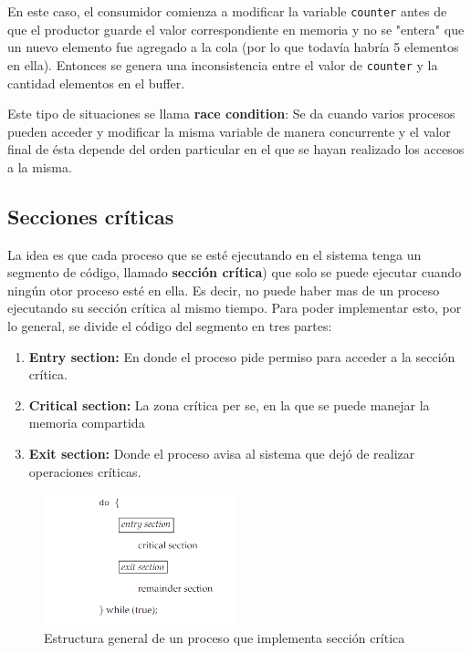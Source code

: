 En este caso, el consumidor comienza a modificar la variable \texttt{counter} antes de que el productor guarde el valor correspondiente en memoria y no se "entera" que un nuevo elemento fue agregado a la cola (por lo que todavía habría 5 elementos en ella). Entonces se genera una inconsistencia entre el valor de \texttt{counter} y la cantidad elementos en el buffer.

Este tipo de situaciones se llama \textbf{race condition}: Se da cuando varios procesos pueden acceder y modificar la misma variable de manera concurrente y el valor final de ésta depende del orden particular en el que se hayan realizado los accesos a la misma.

\subsection{Secciones críticas}
La idea es que cada proceso que se esté ejecutando en el sistema tenga un segmento de código, llamado \textbf{sección crítica}) que solo se puede ejecutar cuando ningún otor proceso esté en ella. Es decir, no puede haber mas de un proceso ejecutando su sección crítica al mismo tiempo. Para poder implementar esto, por lo general, se divide el código del segmento en tres partes:
\begin{enumerate}
	\item \textbf{Entry section:} En donde el proceso pide permiso para acceder a la sección crítica.
	\item \textbf{Critical section:} La zona crítica per se, en la que se puede manejar la memoria compartida
	\item \textbf{Exit section:} Donde el proceso avisa al sistema que dejó de realizar operaciones críticas.
\end{enumerate}
\begin{figure}
	\centering
	\includegraphics[width=0.5\textwidth]{imagenes/structura-seccion-ciritca}
	\caption{Estructura general de un proceso que implementa sección crítica}
	\label{fig:structura-seccion-ciritca}
\end{figure}

